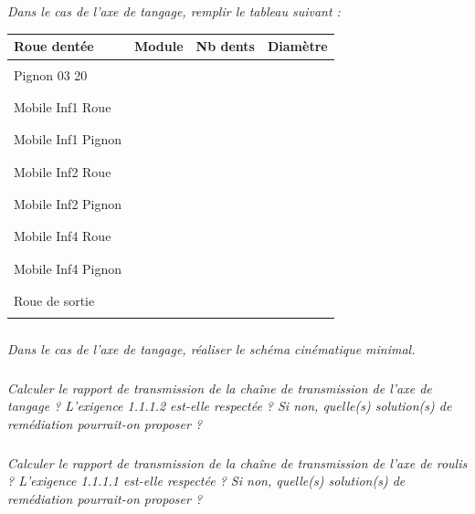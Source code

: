 \documentclass[10pt]{article}
\begin{document}
\subparagraph{}
\textit{Dans le cas de l'axe de tangage, remplir le tableau suivant :}
\begin{center}
\begin{tabular}{|l|c|c|c|}
\hline
Roue dentée & Module & Nb dents & Diamètre \\
\hline
& && \\ 
Pignon 03 20 & && \\ 
&& & \\ \hline
&& & \\ 
Mobile Inf1 Roue & && \\ 
&& & \\ \hline
&& & \\ 
Mobile Inf1 Pignon & && \\ 
&& & \\ \hline
&& & \\ 
Mobile Inf2 Roue & && \\ 
&& & \\ \hline
&& & \\ 
Mobile Inf2 Pignon & && \\ 
&& & \\ \hline
&& & \\ 
Mobile Inf4 Roue & && \\ 
&& & \\ \hline
&& & \\ 
Mobile Inf4 Pignon & && \\ 
&& & \\ \hline
&& & \\ 
Roue de sortie & && \\
&& & \\ 
\hline
\end{tabular}
\end{center}



\subparagraph{}
\textit{Dans le cas de l'axe de tangage, réaliser le schéma cinématique minimal.}


\subparagraph{}
\textit{Calculer le rapport de transmission de la chaîne de transmission de l'axe de tangage ? L'exigence 1.1.1.2 est-elle respectée ? Si non, quelle(s) solution(s) de remédiation pourrait-on proposer ?}

\subparagraph{}
\textit{Calculer le rapport de transmission de la chaîne de transmission de l'axe de roulis ? L'exigence 1.1.1.1 est-elle respectée ? Si non, quelle(s) solution(s) de remédiation pourrait-on proposer ?}
\end{document}
